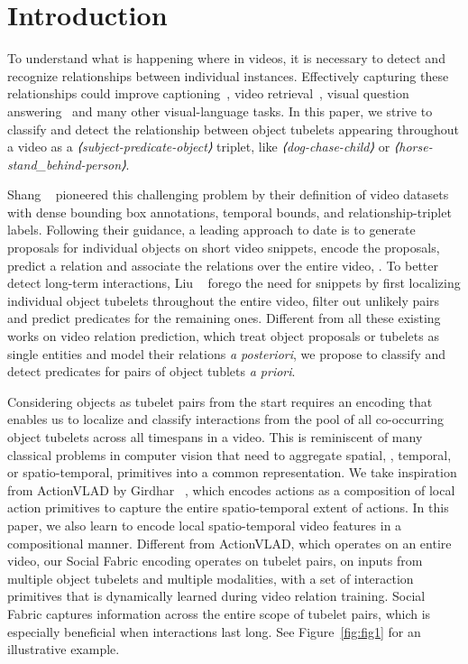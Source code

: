 \documentclass[10pt,twocolumn,letterpaper]{article}
\begin{document}
\section{Introduction}
To understand what is happening where in videos, it is necessary to detect and recognize relationships between individual instances. Effectively capturing these relationships could improve  captioning~\cite{show}, video retrieval~\cite{snoek2009concept}, visual question answering~\cite{antol2015vqa} and many other visual-language tasks.
In this paper, we strive to classify and detect the relationship between object tubelets appearing throughout a video as a \emph{⟨subject-predicate-object⟩} triplet, like \emph{⟨dog-chase-child⟩} or \emph{⟨horse-stand\_behind-person⟩}.

Shang \etal~\cite{shang2017video,shang2019annotating} pioneered this challenging problem by their definition of video datasets with dense bounding box annotations, temporal bounds, and relationship-triplet labels. Following their guidance, a leading approach to date is to generate proposals for individual objects on short video snippets, encode the proposals, predict a relation and associate the relations over the entire video, \eg \cite{qian2019video, xie2020video, su2020video}. 
To better detect long-term interactions, Liu \etal~\cite{liu2020beyond} forego the need for snippets by first localizing individual object tubelets throughout the entire video, filter out unlikely pairs and predict predicates for the remaining ones. 
Different from all these existing works on video relation prediction, which treat object proposals or tubelets as single entities and model their relations \emph{a posteriori}, we propose to classify and detect predicates for pairs of object tublets \emph{a priori}. 

Considering objects as tubelet pairs from the start requires an encoding that enables us to localize and classify interactions from the pool of all co-occurring object tubelets across all timespans in a video. This is reminiscent of many classical problems in computer vision that need to aggregate spatial, \eg \cite{sivic2003video, gemertPAMI10, jegou2010aggregating, arandjelovic2016netvlad}, temporal, \eg \cite{wang2016temporal,lin2018nextvlad,yue2015beyond} or spatio-temporal, \eg \cite{girdhar2017actionvlad,miech2017learnable,girdhar2019video} primitives into a common representation.
We take inspiration from ActionVLAD by Girdhar \etal~\cite{girdhar2017actionvlad}, which encodes actions as a composition of local action primitives to capture the entire spatio-temporal extent of actions. In this paper, we also learn to encode local spatio-temporal video features in a compositional manner. Different from ActionVLAD, which operates on an entire video, our Social Fabric encoding operates on tubelet pairs, \ie
on inputs from multiple object tubelets and multiple modalities, with a set of interaction primitives that is dynamically learned during video relation training. Social Fabric captures information across the entire scope of tubelet pairs, which is especially beneficial when interactions last long. See Figure~\ref{fig:fig1} for an illustrative example.
\end{document}
